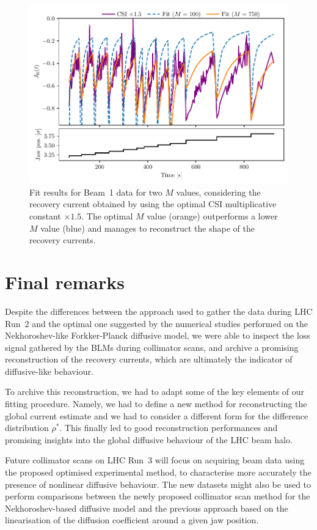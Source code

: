 \begin{figure}[hpt]
    \centering
    \includegraphics[trim={0 2.5mm 0 3mm}, clip, width=0.95\columnwidth]{5_Diffusion_measurement_LHC/figs/fifth.pdf}
    \caption{Fit results for Beam~1 data for two $M$ values, considering the recovery current obtained by using the optimal CSI multiplicative constant $\times 1.5$. The optimal $M$ value (orange) outperforms a lower $M$ value (blue) and manages to reconstruct the shape of the recovery currents.}
    \label{fig:fifth}
\end{figure}
%
\section{Final remarks}
%
Despite the differences between the approach used to gather the data during LHC Run~2 and the optimal one suggested by the numerical studies performed on the Nekhoroshev-like Forkker-Planck diffusive model, we were able to inspect the loss signal gathered by the BLMs during collimator scans, and archive a promising reconstruction of the recovery currents, which are ultimately the indicator of diffusive-like behaviour.

To archive this reconstruction, we had to adapt some of the key elements of our fitting procedure. Namely, we had to define a new method for reconstructing the global current estimate and we had to consider a different form for the difference distribution $\rho^\ast$. This finally led to good reconstruction performances and promising insights into the global diffusive behaviour of the LHC beam halo.

Future collimator scans on LHC Run~3 will focus on acquiring beam data using the proposed optimised experimental method, to characterise more accurately the presence of nonlinear diffusive behaviour. The new datasets might also be used to perform comparisons between the newly proposed collimator scan method for the Nekhoroshev-based diffusive model and the previous approach based on the linearisation of the diffusion coefficient around a given jaw position.
